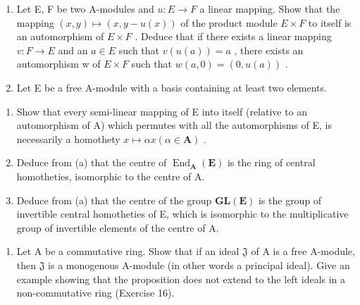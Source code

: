 \begin{enumerate}
\def\labelenumi{\arabic{enumi}.}
\setcounter{enumi}{24}
\item
  Let E, F be two A-modules and \(u: E \to F\) a linear mapping. Show that the mapping \((x, y) \mapsto (x, y - u(x))\) of the product module \(E \times F\) to itself is an automorphism of \(E \times F\) . Deduce that if there exists a linear mapping \(v: F \to E\) and an \(a \in E\) such that \(v(u(a)) = a\) , there exists an automorphism w of \(E \times F\) such that \(w(a, 0) = (0, u(a))\) .
\item
  Let E be a free A-module with a basis containing at least two elements.
\end{enumerate}

\begin{enumerate}
\def\labelenumi{(\alph{enumi})}
\item
  Show that every semi-linear mapping of E into itself (relative to an automorphism of A) which permutes with all the automorphisms of E, is necessarily a homothety \(x \mapsto \alpha x (\alpha \in \mathbf{A})\) .
\item
  Deduce from (a) that the centre of \(\operatorname{End}_{\mathbf{A}}(\mathbf{E})\) is the ring of central homotheties, isomorphic to the centre of A.
\item
  Deduce from (a) that the centre of the group \(\mathbf{GL}(\mathbf{E})\) is the group of invertible central homotheties of E, which is isomorphic to the multiplicative group of invertible elements of the centre of A.
\end{enumerate}

\begin{enumerate}
\def\labelenumi{\arabic{enumi}.}
\setcounter{enumi}{26}
\tightlist
\item
  Let A be a commutative ring. Show that if an ideal \(\mathfrak{J}\) of A is a free A-module, then \(\mathfrak{J}\) is a monogenous A-module (in other words a principal ideal). Give an example showing that the proposition does not extend to the left ideals in a non-commutative ring (Exercise 16).
\end{enumerate}

